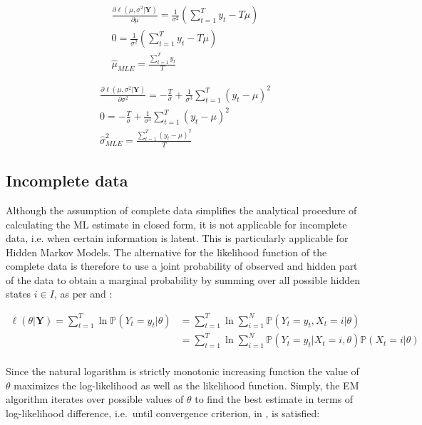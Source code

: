 \begin{gather} 
\frac{\partial \ell(\mu,\sigma^2|\textbf{Y})}{\partial \mu}  = \frac{1}{\sigma^2} (\sum_{t=1}^{T} y_t - T\mu) \nonumber \\
0 = \frac{1}{\sigma^2} (\sum_{t=1}^{T} y_t - T\mu) \nonumber\\
\hat{\mu}_{MLE} = \frac{\sum_{t=1}^{T} y_t}{T} \label{eq:MLEmu}
\end{gather}

\begin{gather} 
\frac{\partial \ell(\mu,\sigma^2|\textbf{Y})}{\partial \sigma^2}  = -\frac{T}{\sigma}+ \frac{1}{\sigma^3} \sum_{t=1}^{T} {(y_t - \mu)}^2 \nonumber\\
0 = -\frac{T}{\sigma}+ \frac{1}{\sigma^3} \sum_{t=1}^{T} {(y_t - \mu)}^2 \nonumber\\
\hat{\sigma}_{MLE}^2 = \frac{\sum_{t=1}^{T} {(y_t - \mu)}^2}{T} \label{eq:MLEsigma} 
\end{gather}

\subsection*{Incomplete data}

Although the assumption of complete data simplifies the analytical procedure of calculating the ML estimate in closed form, 
it is not applicable for incomplete data, i.e. when certain information is latent. This is particularly applicable for Hidden Markov Models. 
The alternative for the likelihood function of the complete data is therefore to use a joint probability of observed and hidden part of the data to 
obtain a marginal probability by summing over all possible hidden states $i \in I$, as per \citep{Jurafsky2008} and \citep{Devavrat2014}:

\begin{align} \label{eq:loglike}
\ell(\theta|\textbf{Y}) = \sum_{t=1}^{T} \ln \mathbb{P}(Y_t= y_t|\theta) & = \sum_{t=1}^{T} \ln \sum\limits_{i=1}^N \mathbb{P}(Y_t= y_t,X_t=i|\theta) \\
 & = \sum_{t=1}^{T} \ln \sum\limits_{i=1}^N \mathbb{P}(Y_t= y_t|X_t=i,\theta) \mathbb{P}(X_t=i|\theta) \nonumber \\
\end{align}

Since the natural logarithm is strictly monotonic increasing function the value of $\theta$ maximizes the log-likelihood as well as the 
likelihood function. Simply, the EM algorithm iterates over possible values of $\theta$ to find the best estimate in terms of log-likelihood difference, 
i.e.\ until convergence criterion, in \citep{McLachlan2008}, is satisfied:

